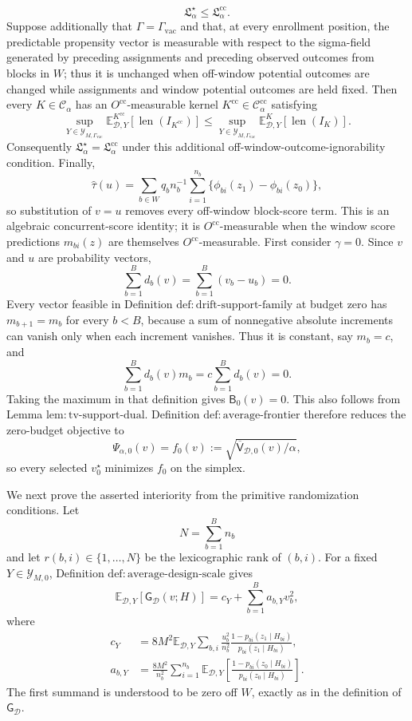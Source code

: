 \[
 \mathfrak L_\alpha^\star\le\mathfrak L_\alpha^{\mathrm{cc}}.
\]
Suppose additionally that \(\Gamma=\Gamma_{\mathrm{vac}}\) and that, at every enrollment position, the predictable propensity vector is measurable with respect to the sigma-field generated by preceding assignments and preceding observed outcomes from blocks in \(W\); thus it is unchanged when off-window potential outcomes are changed while assignments and window potential outcomes are held fixed.  Then every \(K\in\mathcal C_\alpha\) has an \(O^{\mathrm{cc}}\)-measurable kernel \(K^{\mathrm{cc}}\in\mathcal C_\alpha^{\mathrm{cc}}\) satisfying
\[
 \sup_{Y\in\mathcal Y_{M,\Gamma_{\mathrm{vac}}}}
 \mathbb E^{K^{\mathrm{cc}}}_{\mathcal D,Y}[\operatorname{len}(I_{K^{\mathrm{cc}}})]
 \le
 \sup_{Y\in\mathcal Y_{M,\Gamma_{\mathrm{vac}}}}
 \mathbb E^K_{\mathcal D,Y}[\operatorname{len}(I_K)].
\]
Consequently \(\mathfrak L_\alpha^\star=\mathfrak L_\alpha^{\mathrm{cc}}\) under this additional off-window-outcome-ignorability condition.  Finally,
\[
 \widehat\tau(u)=
 \sum_{b\in W}q_b n_b^{-1}\sum_{i=1}^{n_b}
 \{\phi_{bi}(z_1)-\phi_{bi}(z_0)\},
\]
so substitution of \(v=u\) removes every off-window block-score term.  This is an algebraic concurrent-score identity; it is \(O^{\mathrm{cc}}\)-measurable when the window score predictions \(m_{bi}(z)\) are themselves \(O^{\mathrm{cc}}\)-measurable.
First consider \(\gamma=0\).  Since \(v\) and \(u\) are probability vectors,
\[
 \sum_{b=1}^B d_b(v)=\sum_{b=1}^B(v_b-u_b)=0.
\]
Every vector feasible in Definition \(\mathrm{def:drift\text{-}support\text{-}family}\) at budget zero has \(m_{b+1}=m_b\) for every \(b<B\), because a sum of nonnegative absolute increments can vanish only when each increment vanishes.  Thus it is constant, say \(m_b=c\), and
\[
 \sum_{b=1}^B d_b(v)m_b=c\sum_{b=1}^B d_b(v)=0.
\]
Taking the maximum in that definition gives \(\mathsf B_0(v)=0\).  This also follows from Lemma \(\mathrm{lem:tv\text{-}support\text{-}dual}\).  Definition \(\mathrm{def:average\text{-}frontier}\) therefore reduces the zero-budget objective to
\[
 \Psi_{\alpha,0}(v)=
 f_0(v):=\sqrt{\overline{\mathsf V}_{\mathcal D,0}(v)/\alpha},
\]
so every selected \(v_0^\star\) minimizes \(f_0\) on the simplex.

We next prove the asserted interiority from the primitive randomization conditions.  Let
\[
 N=\sum_{b=1}^B n_b
\]
and let \(r(b,i)\in\{1,\ldots,N\}\) be the lexicographic rank of \((b,i)\).  For a fixed \(Y\in\mathcal Y_{M,0}\), Definition \(\mathrm{def:average\text{-}design\text{-}scale}\) gives
\[
 \mathbb E_{\mathcal D,Y}[\mathsf G_{\mathcal D}(v;H)]
 =c_Y+\sum_{b=1}^B a_{b,Y}v_b^2,
\]
where
\[
 \begin{aligned}
 c_Y&=8M^2\mathbb E_{\mathcal D,Y}
 \sum_{b,i}\frac{u_b^2}{n_b^2}
 \frac{1-p_{bi}(z_1\mid H_{bi})}{p_{bi}(z_1\mid H_{bi})},\\
 a_{b,Y}&=\frac{8M^2}{n_b^2}\sum_{i=1}^{n_b}
 \mathbb E_{\mathcal D,Y}\!\left[
 \frac{1-p_{bi}(z_0\mid H_{bi})}{p_{bi}(z_0\mid H_{bi})}
 \right].
 \end{aligned}
\]
The first summand is understood to be zero off \(W\), exactly as in the definition of \(\mathsf G_{\mathcal D}\).

